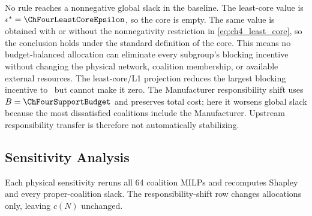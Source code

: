 \begin{table}[htbp]
\centering
\caption{Allocation-Rule Comparison}
\label{tab:allocation_rules}
\end{table}

No rule reaches a nonnegative global slack in the baseline. The least-core value is $\epsilon^*=\ChFourLeastCoreEpsilon$, so the core is empty. The same value is obtained with or without the nonnegativity restriction in \eqref{eq:ch4_least_core}, so the conclusion holds under the standard definition of the core. This means no budget-balanced allocation can eliminate every subgroup's blocking incentive without changing the physical network, coalition membership, or available external resources. The least-core/L1 projection reduces the largest blocking incentive to \ChFourLeastCoreEpsilonShort\ but cannot make it zero. The Manufacturer responsibility shift uses $B=\ChFourSupportBudget$ and preserves total cost; here it worsens global slack because the most dissatisfied coalitions include the Manufacturer. Upstream responsibility transfer is therefore not automatically stabilizing.

\subsection{Sensitivity Analysis}

Each physical sensitivity reruns all 64 coalition MILPs and recomputes Shapley and every proper-coalition slack. The responsibility-shift row changes allocations only, leaving $c(N)$ unchanged.

\begin{table}[htbp]
\centering
\caption[Sensitivity of Grand-Coalition Cost, Manufacturer Allocation, and Stability]{Sensitivity of Grand-Coalition Cost, Manufacturer Allocation, and Stability. A negative least-core value means that a stable allocation exists even if the Shapley allocation is blocked.}
\label{tab:sensitivity}
\end{table}


